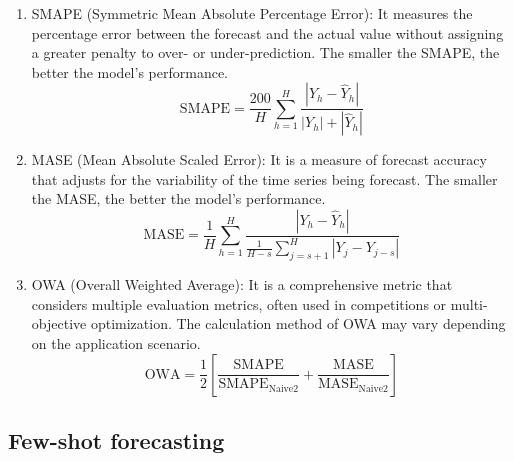 \documentclass[conference]{IEEEtran}
\begin{document}
\begin{enumerate}
    \item SMAPE (Symmetric Mean Absolute Percentage Error): It measures the percentage error between the forecast and the actual value without assigning a greater penalty to over- or under-prediction. The smaller the SMAPE, the better the model's performance.
          \[\text{SMAPE} = \frac{200}{H} \sum_{h=1}^{H} \frac{|Y_{h} - \hat{Y}_{h}|}{|Y_{h}| + |\hat{Y}_{h}|}\]
    \item MASE (Mean Absolute Scaled Error): It is a measure of forecast accuracy that adjusts for the variability of the time series being forecast. The smaller the MASE, the better the model's performance.
          \[\text{MASE} = \frac{1}{H} \sum_{h=1}^{H} \frac{|Y_{h} - \hat{Y}_{h}|}{\frac{1}{H-s} \sum_{j=s+1}^{H} |Y_{j} - Y_{j-s}|}\]
    \item OWA (Overall Weighted Average): It is a comprehensive metric that considers multiple evaluation metrics, often used in competitions or multi-objective optimization. The calculation method of OWA may vary depending on the application scenario.
          \[\text{OWA} = \frac{1}{2} \left[\frac{\text{SMAPE}}{\text{SMAPE}_{\text{Naive}2}} + \frac{\text{MASE}}{\text{MASE}_{\text{Naive}2}}\right]\]
\end{enumerate}


\subsection{Few-shot forecasting}
\end{document}
